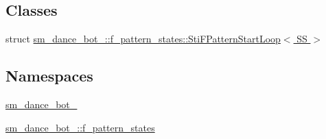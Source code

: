 \subsection*{Classes}
\begin{DoxyCompactItemize}
\item 
struct \hyperlink{classsm__dance__bot__2_1_1f__pattern__states_1_1StiFPatternStartLoop}{sm\+\_\+dance\+\_\+bot\+\_\+::f\+\_\+pattern\+\_\+states\+::\+Sti\+F\+Pattern\+Start\+Loop$<$ S\+S $>$}
\end{DoxyCompactItemize}
\subsection*{Namespaces}
\begin{DoxyCompactItemize}
\item 
 \hyperlink{namespacesm__dance__bot__2}{sm\+\_\+dance\+\_\+bot\+\_}
\item 
 \hyperlink{namespacesm__dance__bot__2_1_1f__pattern__states}{sm\+\_\+dance\+\_\+bot\+\_\+::f\+\_\+pattern\+\_\+states}
\end{DoxyCompactItemize}
